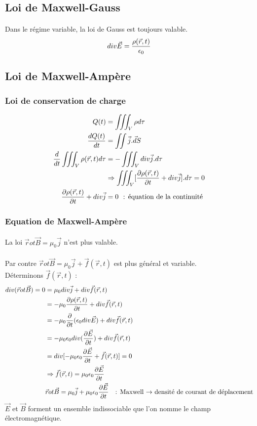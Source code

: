 \documentclass[11pt,a4paper,french]{article}
\begin{document}
\subsection{Loi de Maxwell-Gauss}
\paragraph{}
Dans le régime variable, la loi de Gauss est toujours valable.
$$div \vec E = {\rho(\vec r, t) \over \epsilon_0}$$
\subsection{Loi de Maxwell-Ampère}
\subsubsection{Loi de conservation de charge}
\begin{align*}
Q(t)&=\iiint_V \rho d \tau \\
{dQ(t) \over dt} &= \iint \vec j . \vec dS \\
{d \over dt} \iiint_V \rho(\vec r, t)d\tau &= -\iiint_V div \vec j .d\tau \\
&\Rightarrow \iiint_V [{\partial \rho (\vec r, t) \over \partial t} + div \vec j]. d\tau = 0 \\
{\partial \rho(\vec r, t) \over \partial t} + div \vec j &= 0 ~~\text{: équation de la continuité }
\end{align*}
\subsubsection{Equation de Maxwell-Ampère}
\paragraph{}
La loi $\vec rot\vec B = \mu_0 \vec j$ n'est plus valable. \\ \\
Par contre $\vec rot\vec B = \mu_0 \vec j + \vec f(\vec r, t)$ est plus général et variable. \\
Déterminons $\vec f(\vec r, t)$ :
\begin{align*}
div(\vec rot \vec B)= 0 &= \mu_0 div \vec j + div \vec f(\vec r, t) \\
&= - \mu_0 {\partial \rho(\vec r, t) \over \partial t} + div \vec f(\vec r, t) \\
&= - \mu_0 {\partial \over \partial t}(\epsilon_0 div \vec E) + div \vec f(\vec r, t) \\
&= - \mu_0 \epsilon_0 div ({\partial \vec E \over \partial t}) + div \vec f(\vec r, t) \\
&= div [-\mu_0 \epsilon_0 { \partial \vec E \over \partial t} + \vec f(\vec r, t)] = 0 \\
&\Rightarrow \vec f(\vec r, t) = \mu_0 \epsilon_0 {\partial \vec E \over \partial t} \\
& \vec rot \vec B = \mu_0 \vec j + \mu_0 \epsilon_0 {\partial \vec E \over \partial t} ~~ \text{ : Maxwell $ \rightarrow $ densité de courant de déplacement}
\end{align*}
$\vec E$ et $\vec B$ forment un ensemble indissociable que l'on nomme le champ électromagnétique.
\end{document}
